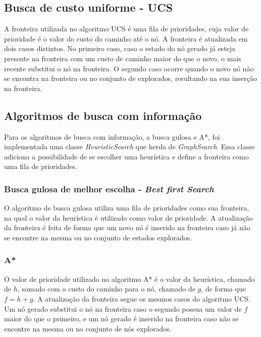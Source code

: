 \subsection{Busca de custo uniforme - UCS}
A fronteira utilizada no algoritmo UCS é uma fila de prioridades, cuja valor de prioridade é o valor do custo do caminho até o nó. A fronteira é atualizada em dois casos distintos. No primeiro caso, caso o estado do nó gerado já esteja presente na fronteira com um custo de caminho maior do que o novo, o mais recente substitui o nó na fronteira. O segundo caso ocorre quando o novo nó não se encontra na fronteira ou no conjunto de explorados, resultando na sua inserção na fronteira.



\subsection{Algoritmos de busca com informação}
Para os algoritmos de busca com informação, a busca gulosa e A*, foi implementada uma classe \textit{HeuristicSearch} que herda de \textit{GraphSearch}. Essa classe adiciona a possibilidade de se escolher uma heurística e define a fronteira como uma fila de prioridades.

\subsubsection{Busca gulosa de melhor escolha - \textit{Best first Search}}
O algoritmo de busca gulosa utiliza uma fila de prioridades como sua fronteira, na qual o valor da heurística é utilizado como valor de prioridade. A atualização da fronteira é feita de forma que um novo nó é inserido na fronteira caso já não se encontre na mesma ou no conjunto de estados explorados.

\subsubsection{A*}
O valor de prioridade utilizado no algoritmo A* é o valor da heurística, chamado de $h$, somado com o custo do caminho para o nó, chamado de $g$, de forma que $f = h + g$. A atualização da fronteira segue os mesmos casos do algoritmo UCS. Um nó gerado substitui o nó na fronteira caso o segundo possua um valor de $f$ maior do que o primeiro, e um nó gerado é inserido na fronteira caso não se encontre na mesma ou no conjunto de nós explorados.

